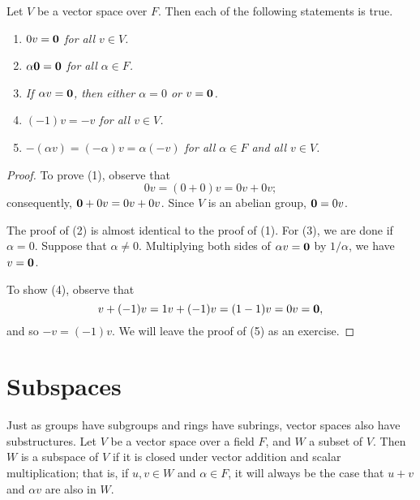  
\begin{proposition}
Let $V$ be a vector space over $F$. Then each of the following
statements is true. 
\begin{enumerate}

\rm \item \it 
$0v ={\bold 0}$ for all $v \in V$.

\rm \item \it 
$\alpha {\bold 0} = {\bold 0}$ for all $\alpha \in F$.


\rm \item \it 
If $\alpha v = {\bold 0}$, then either $\alpha = 0$ or $v = {\bold
0}$.  

\rm \item \it
$(-1) v = -v$ for all $v \in V$.

\rm \item \it 
$-(\alpha v) = (-\alpha)v = \alpha(-v)$ for all $\alpha \in F$ and all
$v \in V$. 

\end{enumerate}
\end{proposition}


\begin{proof}
To prove (1), observe that 
\[
0 v = (0 + 0)v = 0v + 0v;
\]
consequently, ${\bold 0} + 0 v = 0v + 0v$. Since $V$ is an abelian
group, ${\bold 0} = 0v$. 


The proof of (2) is almost identical to the proof of (1). For (3), we
are done if $\alpha = 0$.  Suppose that $\alpha \neq 0$. Multiplying
both sides of $\alpha v = {\bold 0}$ by $1/ \alpha$, we have $v =
{\bold 0}$.


To show (4), observe that
\[
v + (-1)v = 1v + (-1)v = (1-1)v = 0v = {\bold 0},
\]
and so $-v = (-1)v$. We will leave the proof of (5) as an exercise.
\end{proof}
 
 
 
\section{Subspaces}


Just as groups have subgroups and rings have subrings, vector spaces
also have substructures. Let $V$ be a vector space over a field $F$,
and $W$ a subset of $V$. Then $W$ is a {\bfi subspace\/} of $V$ if it is closed under vector addition and
scalar multiplication; that is, if $u, v \in W$ and $\alpha
\in F$, it will always be the case that $u+v$ and $\alpha v$ are also
in $W$.   
 


